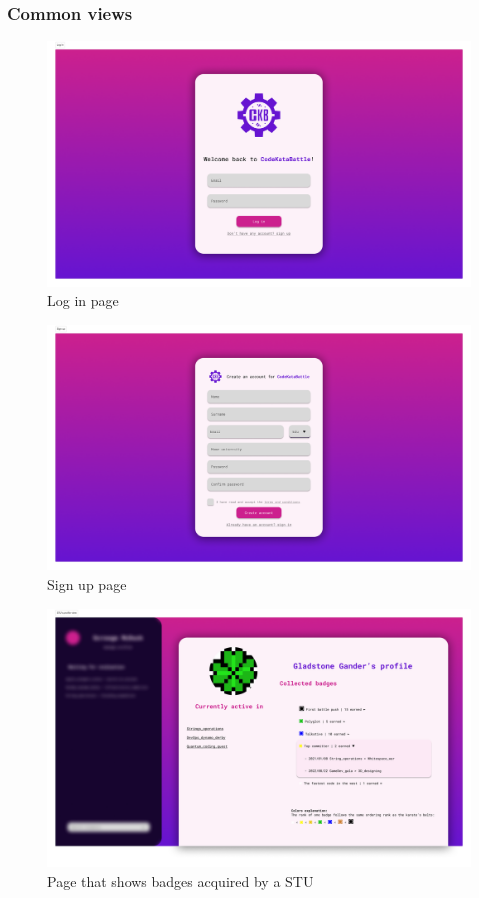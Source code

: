 \subsubsection*{Common views}
\begin{figure}[H]
    \centering
    \includegraphics[width=1\textwidth]{images/user_interfaces/log_in.png}
    \caption{Log in page}
\end{figure}
\begin{figure}[H]
    \centering
    \includegraphics[width=1\textwidth]{images/user_interfaces/sign_up.png}
    \caption{Sign up page}
\end{figure}
\begin{figure}[H]
    \centering
    \includegraphics[width=1\textwidth]{images/user_interfaces/profile.png}
    \caption{Page that shows badges acquired by a STU}
\end{figure}

